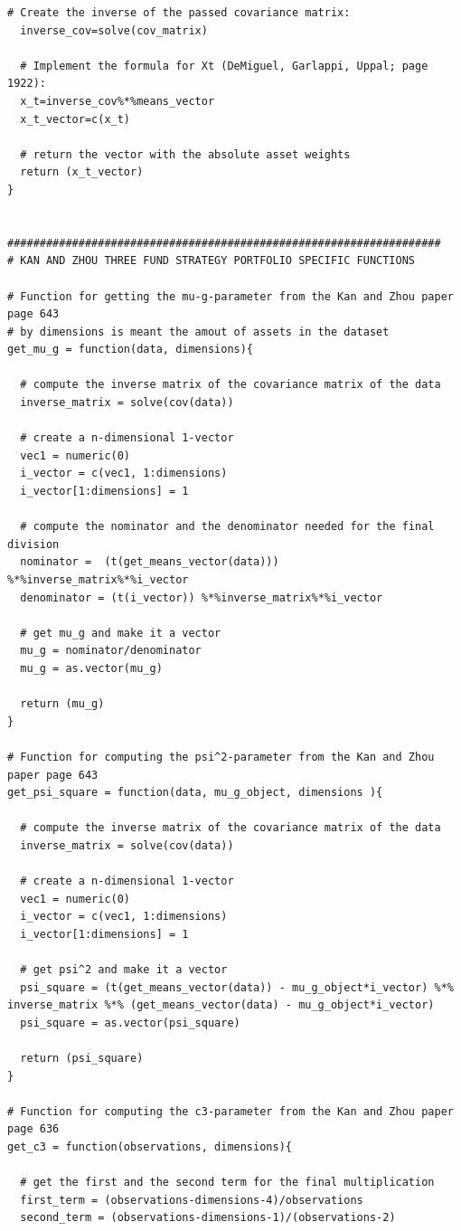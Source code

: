 \documentclass{article}
\begin{document}
\begin{lstlisting}[caption={This listing shows the entire code developed in R.}, label=code:1,frame=single]
  # Create the inverse of the passed covariance matrix:
  inverse_cov=solve(cov_matrix)
  
  # Implement the formula for Xt (DeMiguel, Garlappi, Uppal; page 1922):
  x_t=inverse_cov%*%means_vector
  x_t_vector=c(x_t)
  
  # return the vector with the absolute asset weights
  return (x_t_vector)
}


###################################################################
# KAN AND ZHOU THREE FUND STRATEGY PORTFOLIO SPECIFIC FUNCTIONS

# Function for getting the mu-g-parameter from the Kan and Zhou paper page 643
# by dimensions is meant the amout of assets in the dataset
get_mu_g = function(data, dimensions){
  
  # compute the inverse matrix of the covariance matrix of the data
  inverse_matrix = solve(cov(data))
  
  # create a n-dimensional 1-vector
  vec1 = numeric(0)
  i_vector = c(vec1, 1:dimensions)
  i_vector[1:dimensions] = 1
  
  # compute the nominator and the denominator needed for the final division
  nominator =  (t(get_means_vector(data))) %*%inverse_matrix%*%i_vector
  denominator = (t(i_vector)) %*%inverse_matrix%*%i_vector
  
  # get mu_g and make it a vector
  mu_g = nominator/denominator
  mu_g = as.vector(mu_g)
  
  return (mu_g)
}

# Function for computing the psi^2-parameter from the Kan and Zhou paper page 643
get_psi_square = function(data, mu_g_object, dimensions ){
  
  # compute the inverse matrix of the covariance matrix of the data
  inverse_matrix = solve(cov(data))
  
  # create a n-dimensional 1-vector
  vec1 = numeric(0)
  i_vector = c(vec1, 1:dimensions)
  i_vector[1:dimensions] = 1
  
  # get psi^2 and make it a vector
  psi_square = (t(get_means_vector(data)) - mu_g_object*i_vector) %*% inverse_matrix %*% (get_means_vector(data) - mu_g_object*i_vector)
  psi_square = as.vector(psi_square)
  
  return (psi_square)
}

# Function for computing the c3-parameter from the Kan and Zhou paper page 636
get_c3 = function(observations, dimensions){
  
  # get the first and the second term for the final multiplication
  first_term = (observations-dimensions-4)/observations
  second_term = (observations-dimensions-1)/(observations-2)
  

\end{lstlisting}
\end{document}
